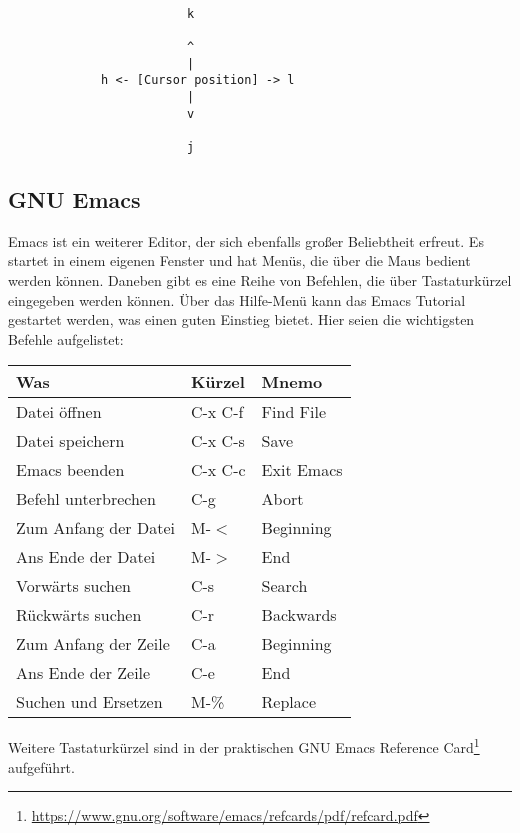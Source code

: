 \documentclass[titlepage,a4paper]{article}
\begin{document}
\begin{samepage}
\begin{verbatim}

                         k

                         ^
                         |
             h <- [Cursor position] -> l
                         |
                         v

                         j

\end{verbatim}
\end{samepage}

\subsection{GNU Emacs}
\label{sec:emacs}

Emacs ist ein weiterer Editor, der sich ebenfalls großer Beliebtheit erfreut.
Es startet in einem eigenen Fenster und hat Menüs, die über die Maus bedient werden können.
Daneben gibt es eine Reihe von Befehlen, die über Tastaturkürzel eingegeben werden können.
Über das Hilfe-Menü kann das Emacs Tutorial gestartet werden, was einen guten Einstieg bietet.
Hier seien die wichtigsten Befehle aufgelistet:

\noindent
\begin{tabular}{| l | l | l |}
\hline
\textbf{Was} & \textbf{Kürzel} & \textbf{Mnemo} \\ \hline
Datei öffnen & C-x C-f & Find File \\ \hline
Datei speichern & C-x C-s & Save \\ \hline
Emacs beenden & C-x C-c & Exit Emacs \\ \hline
Befehl unterbrechen & C-g & Abort \\ \hline
Zum Anfang der Datei & M-$<$ & Beginning \\ \hline
Ans Ende der Datei & M-$>$ & End \\ \hline
Vorwärts suchen & C-s & Search \\ \hline
Rückwärts suchen & C-r & Backwards \\ \hline
Zum Anfang der Zeile & C-a & Beginning \\ \hline
Ans Ende der Zeile & C-e & End \\ \hline
Suchen und Ersetzen & M-\% & Replace \\ \hline
\end{tabular}

\noindent
Weitere Tastaturkürzel sind in der praktischen 
GNU Emacs Reference Card\footnote{\url{https://www.gnu.org/software/emacs/refcards/pdf/refcard.pdf}} aufgeführt.
\end{document}
